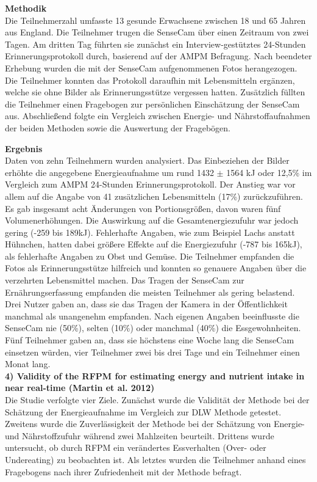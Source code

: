 \textbf{Methodik}\\
Die Teilnehmerzahl umfasste 13 gesunde Erwachsene zwischen 18 und 65 Jahren aus England. Die Teilnehmer trugen die SenseCam über einen Zeitraum von zwei Tagen. Am dritten Tag führten sie zunächst ein Interview-gestütztes 24-Stunden Erinnerungsprotokoll durch, basierend auf der AMPM Befragung.  Nach beendeter Erhebung wurden die mit der SenseCam aufgenommenen Fotos herangezogen. Die Teilnehmer konnten das Protokoll daraufhin mit Lebensmitteln ergänzen, welche sie ohne Bilder als Erinnerungsstütze vergessen hatten. Zusätzlich füllten die Teilnehmer einen Fragebogen zur persönlichen Einschätzung der SenseCam aus. Abschließend folgte ein Vergleich zwischen Energie- und Nährstoffaufnahmen der beiden Methoden sowie die Auswertung der Fragebögen.

\textbf{Ergebnis}\\
Daten von zehn Teilnehmern wurden analysiert. Das Einbeziehen der Bilder erhöhte die angegebene Energieaufnahme um rund 1432 $\pm$ 1564 kJ oder 12,5\% im Vergleich zum AMPM 24-Stunden Erinnerungsprotokoll. Der Anstieg war vor allem auf die Angabe von 41 zusätzlichen Lebensmitteln (17\%) zurückzuführen. Es gab insgesamt acht Änderungen von Portionsgrößen, davon waren fünf Volumenerhöhungen. Die Auswirkung auf die Gesamtenergiezufuhr war jedoch gering (-259 bis 189kJ). Fehlerhafte Angaben, wie zum Beispiel Lachs anstatt Hühnchen, hatten dabei größere Effekte auf die Energiezufuhr (-787 bis 165kJ), als fehlerhafte Angaben zu Obst und Gemüse. 
Die Teilnehmer empfanden die Fotos als Erinnerungsstütze hilfreich und konnten so genauere Angaben über die verzehrten Lebensmittel machen. Das Tragen der SenseCam zur Ernährungserfassung empfanden die meisten Teilnehmer als gering belastend. Drei Nutzer gaben an, dass sie das Tragen der Kamera in der Öffentlichkeit manchmal als unangenehm empfanden. Nach eigenen Angaben beeinflusste die SenseCam nie (50\%), selten (10\%) oder manchmal (40\%) die Essgewohnheiten. Fünf Teilnehmer gaben an, dass sie höchstens eine Woche lang die SenseCam einsetzen würden, vier Teilnehmer zwei bis drei Tage und ein Teilnehmer einen Monat lang. \\


\textbf{4) Validity of the RFPM for estimating energy and nutrient intake in near real-time (Martin et al. 2012)}\\
Die Studie verfolgte vier Ziele. Zunächst wurde die Validität der Methode bei der Schätzung der Energieaufnahme im Vergleich zur DLW Methode getestet. Zweitens wurde die Zuverlässigkeit der Methode bei der Schätzung von Energie- und Nährstoffzufuhr während zwei Mahlzeiten beurteilt. Drittens wurde untersucht, ob durch RFPM ein verändertes Essverhalten (Over- oder Undereating) zu beobachten ist. Als letztes wurden die Teilnehmer anhand eines Fragebogens nach ihrer Zufriedenheit mit der Methode befragt.

